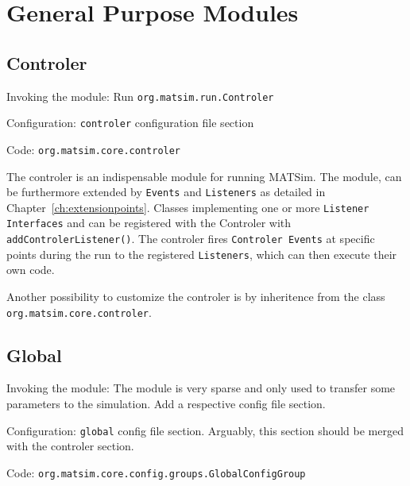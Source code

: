 \section{General Purpose Modules}
\label{sec:generalpurposemodules}

\subsection{Controler}
\label{sec:controler}
\begin{compactitem}
\item Invoking the module: Run \lstinline|org.matsim.run.Controler|
\item Configuration: \lstinline|controler| configuration file section
\item Code: \lstinline|org.matsim.core.controler|
\end{compactitem}

The controler is an indispensable module for running MATSim. The module, can be furthermore extended by \lstinline|Events| and \lstinline|Listeners| as detailed in Chapter~\ref{ch:extensionpoints}. Classes implementing one or more \lstinline|Listener Interfaces| and can be registered with the Controler with \lstinline|addControlerListener()|. The controler fires \lstinline|Controler Events| at specific points during the run to the registered \lstinline|Listeners|, which can then execute their own code.

Another possibility to customize the controler is by inheritence from the class \lstinline|org.matsim.core.controler|.

\subsection{Global}
\label{sec:global}
\begin{compactitem}
\item Invoking the module: The module is very sparse and only used to transfer some parameters to the simulation. Add a respective config file section.
\item Configuration: \lstinline|global| config file section. Arguably, this section should be merged with the controler section.
\item Code: \lstinline|org.matsim.core.config.groups.GlobalConfigGroup|
\end{compactitem}

